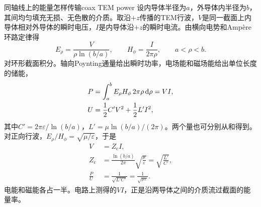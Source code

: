 \begin{example}{同轴线上的能量怎样传输}{coax TEM power}
    设内导体半径为$a$，外导体内半径为$b$，其间均匀填充无损、无色散的介质。取沿$+z$传播的TEM行波，$V$是同一截面上内导体相对外导体的瞬时电压，$I$是内导体沿$+z$的瞬时电流。由横向电势和Ampère环路定律得
    \begin{equation}
        \label{eq:ed-coax-tem-fields}
        E_\rho = \frac{V}{\rho\ln(b/a)},\qquad
        H_\phi = \frac{I}{2\pi\rho},\qquad a < \rho < b .
    \end{equation}
    对环形截面积分。轴向Poynting通量给出瞬时功率，电场能和磁场能给出单位长度的储能，
    \begin{subequations}
        \label{eq:ed-coax-power-energy}
        \begin{align}
            P &= \int_a^b E_\rho H_\phi\,2\pi\rho\mathop{}\!\mathrm{d}\rho = VI,\\
            U &= \frac12 C'V^2 + \frac12 L'I^2 ,
        \end{align}
    \end{subequations}
    其中$C' = 2\pi\varepsilon/\ln(b/a)$，$L' = \mu\ln(b/a)/(2\pi)$。两个量也可分别从和得到。对正向行波，$E_\rho/H_\phi = \sqrt{\mu/\varepsilon}$，于是
    \begin{subequations}
        \label{eq:ed-coax-characteristic-impedance}
        \begin{align}
            V &= Z_{\mathrm c}I,\\
            Z_{\mathrm c} &= \frac{\ln(b/a)}{2\pi}\sqrt{\frac{\mu}{\varepsilon}}
                         = \sqrt{\frac{L'}{C'}},\\
            \frac P U &= \frac1{\sqrt{L'C'}} = \frac1{\sqrt{\mu\varepsilon}} .
        \end{align}
    \end{subequations}
    电能和磁能各占一半。电路上测得的$VI$，正是沿两导体之间的介质流过截面的能量率。
\end{example}

